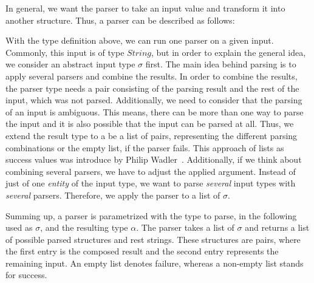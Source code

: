 \documentclass[%
	latex,%
	a4paper,%
	oneside,%
	chapterprefix,%
	headsepline,%
	12pt%
]{scrbook}
\newcommand{\Conid}[1]{\mathit{#1}}
\def\resethooks{%
  \global\let\SaveRestoreHook\empty
  \global\let\ColumnHook\empty}
\let\hspre\empty
\let\hspost\empty
\begin{document}
In general, we want the parser to take an input value and transform it
into another structure. Thus, a parser can be described as
follows:

\begin{hscode}\SaveRestoreHook
\column{B}{@{}>{\hspre}l<{\hspost}@{}}%
\column{E}{@{}>{\hspre}l<{\hspost}@{}}%
\>[B]{}\;\Conid{Parser}\;\sigma \;\alpha \mathrel{=}\sigma \to \alpha {}\<[E]%
\ColumnHook
\end{hscode}\resethooks

With the type definition above, we can run one parser on a given
input. %
Commonly, this input is of type \ensuremath{\Conid{String}}, but in order to explain the
general idea, we consider an abstract input type \ensuremath{\sigma } first. %
The main idea behind parsing is to apply several parsers and combine
the results. %
In order to combine the results, the parser type needs a pair
consisting of the parsing result and the rest of the input, which was
not parsed. %
Additionally, we need to consider that the parsing of an input is
ambiguous. %
This means, there can be more than one way to parse the input and it
is also possible that the input can be parsed at all. %
Thus, we extend the result type to a be a list of pairs, representing
the different parsing combinations or the empty list, if the parser
fails. %
This approach of lists as success values was introduce by Philip
Wadler~\cite{successlist}. %
Additionally, if we think about combining several parsers, we have to
adjust the applied argument. %
Instead of just of one \emph{entity} of the input type, we want to
parse \emph{several} input types with \emph{several} parsers. %
Therefore, we apply the parser to a list of \ensuremath{\sigma }.

\resethooks

Summing up, a parser is parametrized with the type to parse, in the
following used as \ensuremath{\sigma }, and the resulting type \ensuremath{\alpha }. %
The parser takes a list of \ensuremath{\sigma } and returns a list of
possible parsed structures and rest strings. %
These structures are pairs, where the first entry is the composed
result and the second entry represents the remaining input. %
An empty list denotes failure, whereas a non-empty list stands for
success. %
\end{document}
